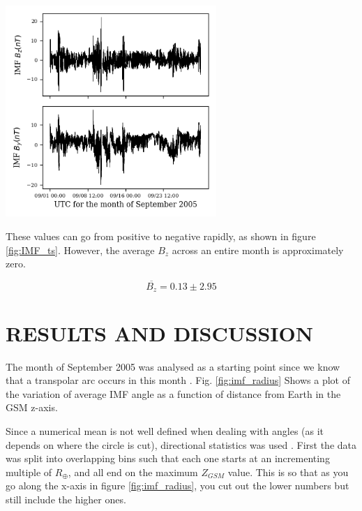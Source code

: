 \documentclass{article}
\newenvironment{Figure}
  {\par\medskip\noindent\minipage{\linewidth}}
  {\endminipage\par\medskip}
\begin{document}
\begin{multicols}{2}
\begin{Figure}
    \centering
    \includegraphics[width=0.6\textwidth]{imf_ts.png}
    \label{fig:IMF_ts}
\end{Figure}

These values can go from positive to negative rapidly, as shown in figure \ref{fig:IMF_ts}. However, the average $B_z$ across an entire month is approximately zero.

\begin{equation}
    \overline{B_z} = 0.13\pm2.95
\end{equation}

\section{RESULTS AND DISCUSSION}
The month of September 2005 was analysed as a starting point since we know that a transpolar arc occurs in this month \cite{Fear1506}.
Fig. \ref{fig:imf_radius} Shows a plot of the variation of average IMF angle as a function of distance from Earth in the GSM z-axis.

Since a numerical mean is not well defined when dealing with angles (as it depends on where the circle is cut), directional statistics was used \cite{mardia_jupp_2000, ClockAngleFear}. First the data was split into overlapping bins such that each one starts at an incrementing multiple of $R_\oplus$, and all end on the maximum $Z_{GSM}$ value. This is so that as you go along the x-axis in figure \ref{fig:imf_radius}, you cut out the lower numbers but still include the higher ones.


\end{multicols}
\end{document}
